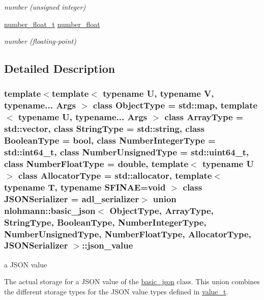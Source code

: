\begin{DoxyCompactItemize}
\begin{DoxyCompactList}\small\item\em number (unsigned integer) \end{DoxyCompactList}\item 
\hyperlink{classnlohmann_1_1basic__json_a88d6103cb3620410b35200ee8e313d97}{number\+\_\+float\+\_\+t} \hyperlink{unionnlohmann_1_1basic__json_1_1json__value_ad003495e39e78b8096e0b6fc690d146f}{number\+\_\+float}
\begin{DoxyCompactList}\small\item\em number (floating-\/point) \end{DoxyCompactList}\end{DoxyCompactItemize}


\subsection{Detailed Description}
\subsubsection*{template$<$template$<$ typename U, typename V, typename... Args $>$ class Object\+Type = std\+::map, template$<$ typename U, typename... Args $>$ class Array\+Type = std\+::vector, class String\+Type = std\+::string, class Boolean\+Type = bool, class Number\+Integer\+Type = std\+::int64\+\_\+t, class Number\+Unsigned\+Type = std\+::uint64\+\_\+t, class Number\+Float\+Type = double, template$<$ typename U $>$ class Allocator\+Type = std\+::allocator, template$<$ typename T, typename S\+F\+I\+N\+A\+E=void $>$ class J\+S\+O\+N\+Serializer = adl\+\_\+serializer$>$\newline
union nlohmann\+::basic\+\_\+json$<$ Object\+Type, Array\+Type, String\+Type, Boolean\+Type, Number\+Integer\+Type, Number\+Unsigned\+Type, Number\+Float\+Type, Allocator\+Type, J\+S\+O\+N\+Serializer $>$\+::json\+\_\+value}

a J\+S\+ON value 

The actual storage for a J\+S\+ON value of the \hyperlink{classnlohmann_1_1basic__json}{basic\+\_\+json} class. This union combines the different storage types for the J\+S\+ON value types defined in \hyperlink{classnlohmann_1_1basic__json_ae8cbef097f7da18a781fc86587de6b90}{value\+\_\+t}.

